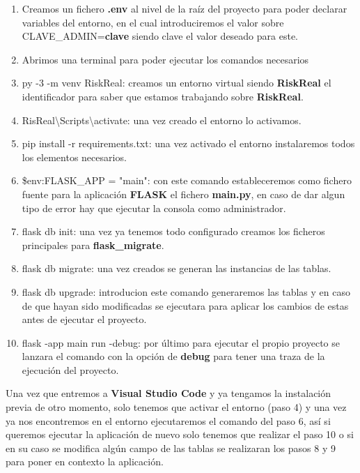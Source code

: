 \begin{enumerate}
    \item Creamos un fichero \textbf{.env} al nivel de la raíz del proyecto para poder declarar variables del entorno, en el cual introduciremos el valor sobre CLAVE\_ADMIN=\textbf{clave} siendo clave el valor deseado para este.
    \item Abrimos una terminal para poder ejecutar los comandos necesarios 
    \item py -3 -m venv RiskReal: creamos un entorno virtual siendo \textbf{RiskReal} el identificador para saber que estamos trabajando sobre \textbf{RiskReal}.
    \item RisReal\textbackslash Scripts\textbackslash activate: una vez creado el entorno lo activamos.
    \item pip install -r requirements.txt: una vez activado el entorno instalaremos todos los elementos necesarios.
    \item \$env:FLASK\_APP = "main": con este comando estableceremos como fichero fuente para la aplicación \textbf{FLASK} el fichero \textbf{main.py}, en caso de dar algun tipo de error hay que ejecutar la consola como administrador.
    \item flask db init: una vez ya tenemos todo configurado creamos los ficheros principales para \textbf{flask\_migrate}.
    \item flask db migrate: una vez creados se generan las instancias de las tablas.
    \item flask db upgrade: introducion este comando generaremos las tablas y en caso de que hayan sido modificadas se ejecutara para aplicar los cambios de estas antes de ejecutar el proyecto.
    \item flask \text{-}-app main run \text{-}-debug: por último para ejecutar el propio proyecto se lanzara el comando con la opción de \textbf{debug} para tener una traza de la ejecución del proyecto.
\end{enumerate}

Una vez que entremos a \textbf{Visual Studio Code} y ya tengamos la instalación previa de otro momento, solo tenemos que activar el entorno (paso 4) y una vez ya nos encontremos en el entorno ejecutaremos el comando del paso 6, así si queremos ejecutar la aplicación de nuevo solo tenemos que realizar el paso 10 o si en su caso se modifica algún campo de las tablas se realizaran los pasos 8 y 9 para poner en contexto la aplicación.

